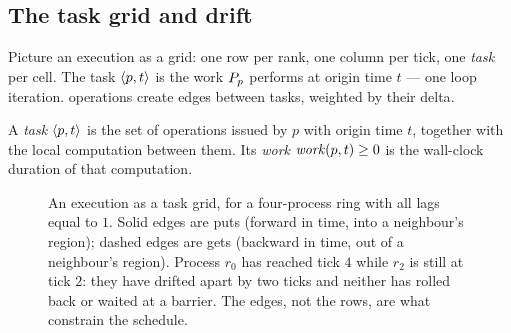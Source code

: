 \subsection{The task grid and drift}
\label{sec:exec-grid}

Picture an execution as a grid: one row per rank, one column per tick, one
\emph{task} per \gls{cell}. The task $\langle p, t\rangle$ is the work $P_{p}$
performs at origin time $t$ --- one loop iteration. \Glspl{operation} create
edges between tasks, weighted by their \gls{delta}.

\begin{definition}[Task]\label{def:task}
A \emph{task} $\langle p, t\rangle$ is the set of operations issued by $p$ with origin
time $t$, together with the local computation between them. Its \emph{work}
$\mathit{work}(p,t) \ge 0$ is the wall-clock duration of that computation.
\end{definition}

\begin{figure}[htbp]
\centering
{}
\caption{An execution as a task grid, for a four-process ring with all lags
equal to $1$. Solid edges are puts (forward in time, into a neighbour's
region); dashed edges are gets (backward in time, out of a neighbour's
region). Process $r_0$ has reached tick $4$ while $r_2$ is still at tick $2$:
they have drifted apart by two ticks and neither has rolled back or waited at
a barrier. The edges, not the rows, are what constrain the schedule.}
\label{fig:task-grid}
\end{figure}

